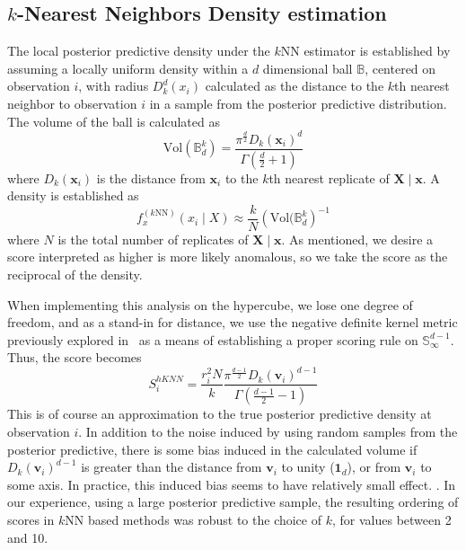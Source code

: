 \subsection{$k$-Nearest Neighbors Density estimation}
The local posterior predictive density under the $k$NN estimator is established by 
  assuming a locally uniform density within a $d$ dimensional ball $\mathbb{B}$, 
  centered on observation $i$, with radius $D_{k}^d(x_i)$ calculated as the 
  distance to the $k$th nearest neighbor to observation $i$ in a sample from the 
  posterior predictive distribution. The volume of the ball is calculated as
  \begin{equation}
    \label{eq:vol_sphere}
    \text{Vol}(\mathbb{B}_d^k) =
      \frac{\pi^{\frac{d}{2}}D_{k}(\bm{x}_i)^d}{\Gamma\left(\frac{d}{2} + 1\right)}
  \end{equation}
  where $D_k(\bm{x}_i)$ is the distance from $\bm{x}_i$ to the $k$th nearest 
  replicate of $\bm{X}\mid\bm{x}$.  A density is established as 
  \begin{equation}
    \label{eq:ad_knn}
    f_{x}^{(k\text{NN})}(x_i\mid X) \approx \frac{k}{N}\left(\text{Vol}(\mathbb{B}_d^k\right)^{-1}
    \end{equation}
  where $N$ is the total number of replicates of $\bm{X}\mid\bm{x}$.  As 
  mentioned, we desire a score interpreted as higher is more likely anomalous, 
  so we take the score as the reciprocal of the density.

When implementing this analysis on the hypercube, we lose one degree of freedom,
  and as a stand-in for distance, we use the negative definite kernel metric 
  previously explored in~\cite{trubey:pg} as a means of establishing a proper 
  scoring rule on $\mathbb{S}_{\infty}^{d-1}$.  Thus, the score becomes
  \begin{equation}
    \label{eq:ad_knn_h}
    S_i^{hKNN} = \frac{r_i^{2}N}{k}
    \frac{\pi^{\frac{d-1}{2}}D_{k}(\bm{v}_i)^{d-1}}{\Gamma\left(\frac{d-1}{2} - 1\right)}
  \end{equation}
  This is of course an approximation to the true posterior predictive density at
  observation $i$.  In addition to the noise induced by using random samples
  from the posterior predictive, there is some bias induced in the calculated volume
  if $D_k(\bm{v}_i)^{d-1}$ is greater than the distance from $\bm{v}_i$ to 
  unity ($\bm{1}_d$), or from $\bm{v}_i$ to some axis.  In practice,
  this induced bias seems to have relatively small effect. 
  .
  In our experience, using a large posterior predictive sample, the resulting 
  ordering of scores in $k$NN based methods was robust to the choice of $k$, for 
  values between 2 and 10.

